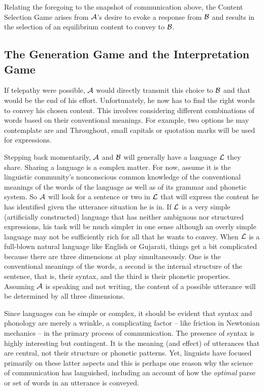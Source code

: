 Relating the foregoing to the snapshot of communication above, the Content Selection Game arises from $\cal A$'s desire to evoke a response from $\cal B$ and results in the selection of an equilibrium content to convey to $\cal B$.

\subsection{The Generation Game and the Interpretation Game}

If telepathy were possible, $\cal A$ would directly transmit this choice to $\cal B$ and that would be the end of his effort. Unfortunately, he now has to find the right words to convey his chosen content. This involves considering different combinations of words based on their conventional meanings. For example, two options he may contemplate are  and  Throughout, small capitals or quotation marks will be used for expressions.

Stepping back momentarily, $\cal A$ and $\cal B$ will generally have a language $\cal L$ they share. Sharing a language is a complex matter. For now, assume it is the linguistic community's nonconscious common knowledge of the conventional meanings of the words of the language as well as of its grammar and phonetic system. So $\cal A$ will look for a sentence or two in $\cal L$ that will express the content he has identified given the utterance situation he is in. If $\cal L$ is a very simple (artificially constructed) language that has neither ambiguous nor structured expressions, his task will be much simpler in one sense although an overly simple language may not be sufficiently rich for all that he wants to convey. When $\cal L$ is a full-blown natural language like English or Gujarati, things get a bit complicated because there are three dimensions at play simultaneously. One is the conventional meanings of the words, a second is the internal structure of the sentence, that is, their syntax, and the third is their phonetic properties. Assuming $\cal A$ is speaking and not writing, the content of a possible utterance will be determined by all three dimensions.

Since languages can be simple or complex, it should be evident that syntax and phonology are merely a wrinkle, a complicating 
factor -- like friction in Newtonian mechanics -- in the primary process of communication. The presence of syntax is highly interesting but contingent. It is the meaning (and effect) of utterances that are central, not their structure or phonetic patterns. Yet, linguists have focused primarily on these latter aspects and this is perhaps one reason why the science of communication has languished, including an account of how the \emph{optimal} parse or set of words in an utterance is conveyed.

